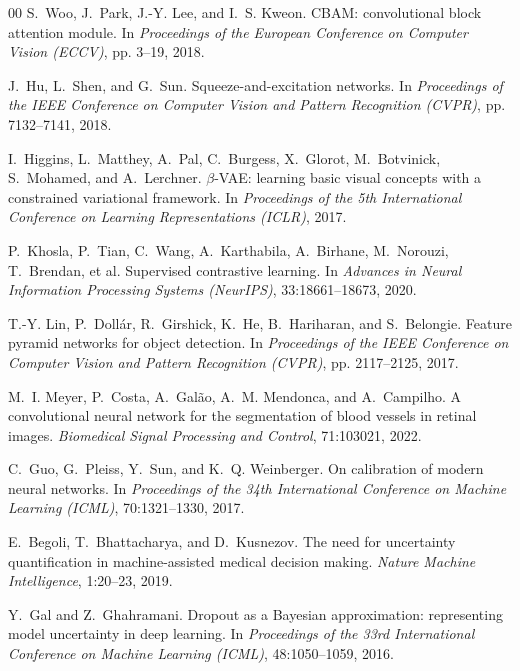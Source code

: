 \documentclass[review,12pt]{elsarticle}
\begin{document}
\begin{thebibliography}{00}
S.~Woo, J.~Park, J.-Y. Lee, and I.~S. Kweon.
\newblock CBAM: convolutional block attention module.
\newblock In \textit{Proceedings of the European Conference on Computer Vision
(ECCV)}, pp. 3--19, 2018.

J.~Hu, L.~Shen, and G.~Sun.
\newblock Squeeze-and-excitation networks.
\newblock In \textit{Proceedings of the IEEE Conference on Computer Vision and
Pattern Recognition (CVPR)}, pp. 7132--7141, 2018.

I.~Higgins, L.~Matthey, A.~Pal, C.~Burgess, X.~Glorot, M.~Botvinick,
S.~Mohamed, and A.~Lerchner.
\newblock $\beta$-VAE: learning basic visual concepts with a constrained
variational framework.
\newblock In \textit{Proceedings of the 5th International Conference on
Learning Representations (ICLR)}, 2017.

P.~Khosla, P.~Tian, C.~Wang, A.~Karthabila, A.~Birhane, M.~Norouzi,
T.~Brendan, et al.
\newblock Supervised contrastive learning.
\newblock In \textit{Advances in Neural Information Processing Systems
(NeurIPS)}, 33:18661--18673, 2020.

T.-Y. Lin, P.~Doll{\'a}r, R.~Girshick, K.~He, B.~Hariharan, and
S.~Belongie.
\newblock Feature pyramid networks for object detection.
\newblock In \textit{Proceedings of the IEEE Conference on Computer Vision and
Pattern Recognition (CVPR)}, pp. 2117--2125, 2017.

M.~I. Meyer, P.~Costa, A.~Gal{\~a}o, A.~M. Mendonca, and A.~Campilho.
\newblock A convolutional neural network for the segmentation of blood vessels
in retinal images.
\newblock \textit{Biomedical Signal Processing and Control},
71:103021, 2022.

C.~Guo, G.~Pleiss, Y.~Sun, and K.~Q. Weinberger.
\newblock On calibration of modern neural networks.
\newblock In \textit{Proceedings of the 34th International Conference on
Machine Learning (ICML)}, 70:1321--1330, 2017.

E.~Begoli, T.~Bhattacharya, and D.~Kusnezov.
\newblock The need for uncertainty quantification in machine-assisted medical
decision making.
\newblock \textit{Nature Machine Intelligence}, 1:20--23, 2019.

Y.~Gal and Z.~Ghahramani.
\newblock Dropout as a Bayesian approximation: representing model uncertainty
in deep learning.
\newblock In \textit{Proceedings of the 33rd International Conference on
Machine Learning (ICML)}, 48:1050--1059, 2016.


\end{thebibliography}
\end{document}
